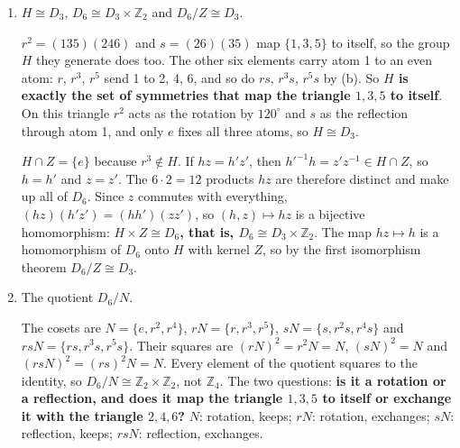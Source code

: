 \documentclass[11pt,a4paper]{article}
\newcommand{\Z}{\mathbb{Z}}
\newenvironment{parts}{\begin{enumerate}[label=\textbf{(\alph*)},leftmargin=2.2em,itemsep=0.6em,topsep=0.2em]}{\end{enumerate}}
\newcommand{\pq}[1]{\item {\color{black!60}#1}\par}
\newcommand{\ans}[1]{{\boldmath\bfseries #1}}
\begin{document}
\begin{parts}
\pq{$H \cong D_3$, $D_6 \cong D_3 \times \Z_2$ and $D_6/Z \cong D_3$.}
$r^2 = (135)(246)$ and $s = (26)(35)$ map $\{1, 3, 5\}$ to itself, so the group $H$ they generate does too. The other six elements carry atom 1 to an even atom: $r$, $r^3$, $r^5$ send 1 to 2, 4, 6, and so do $rs$, $r^3 s$, $r^5 s$ by (b). So \ans{$H$ is exactly the set of symmetries that map the triangle $1, 3, 5$ to itself}. On this triangle $r^2$ acts as the rotation by $120^\circ$ and $s$ as the reflection through atom 1, and only $e$ fixes all three atoms, so \ans{$H \cong D_3$}.

$H \cap Z = \{e\}$ because $r^3 \notin H$. If $hz = h'z'$, then $h'^{-1} h = z' z^{-1} \in H \cap Z$, so $h = h'$ and $z = z'$. The $6 \cdot 2 = 12$ products $hz$ are therefore distinct and make up all of $D_6$. Since $z$ commutes with everything, $(hz)(h'z') = (hh')(zz')$, so $(h, z) \mapsto hz$ is a bijective homomorphism: \ans{$H \times Z \cong D_6$, that is, $D_6 \cong D_3 \times \Z_2$}. The map $hz \mapsto h$ is a homomorphism of $D_6$ onto $H$ with kernel $Z$, so by the first isomorphism theorem \ans{$D_6/Z \cong D_3$}.

\pq{The quotient $D_6/N$.}
The cosets are $N = \{e, r^2, r^4\}$, $rN = \{r, r^3, r^5\}$, $sN = \{s, r^2 s, r^4 s\}$ and $rsN = \{rs, r^3 s, r^5 s\}$. Their squares are $(rN)^2 = r^2 N = N$, $(sN)^2 = N$ and $(rsN)^2 = (rs)^2 N = N$. Every element of the quotient squares to the identity, so \ans{$D_6/N \cong \Z_2 \times \Z_2$}, not $\Z_4$. The two questions: \ans{is it a rotation or a reflection, and does it map the triangle $1, 3, 5$ to itself or exchange it with the triangle $2, 4, 6$?} $N$: rotation, keeps; $rN$: rotation, exchanges; $sN$: reflection, keeps; $rsN$: reflection, exchanges.
\end{parts}
\end{document}
